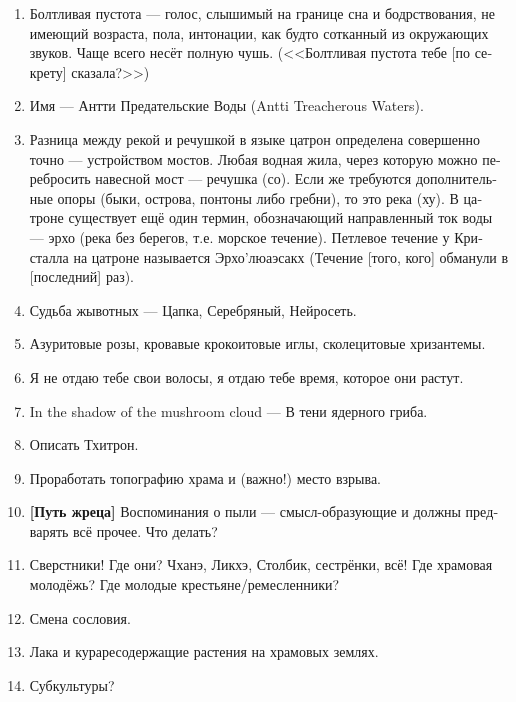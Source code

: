 \documentclass[a4paper,12pt,fleqn]{book}\usepackage{cooltooltips}\usepackage{polyglossia}\setdefaultlanguage[babelshorthands=true]{russian}\setotherlanguage{english}\defaultfontfeatures{Ligatures=TeX,Mapping=tex-text} \usepackage{xcolor}\definecolor{lightgray}{HTML}{bbbbbb}\color{lightgray}\newcommand{\ml}[3]{\textenglish{\textcolor{black}{#3}}}
\begin{document}
{\begin{enumerate}
\item Болтливая пустота --- голос, слышимый на границе сна и бодрствования, не имеющий возраста, пола, интонации, как будто сотканный из окружающих звуков.
Чаще всего несёт полную чушь.
(<<Болтливая пустота тебе [по секрету] сказала?>>)

\item Имя --- Антти Предательские Воды (Antti Treacherous Waters).

\item Разница между рекой и речушкой в языке цатрон определена совершенно точно --- устройством мостов.
Любая водная жила, через которую можно перебросить навесной мост --- речушка (со).
Если же требуются дополнительные опоры (быки, острова, понтоны либо гребни), то это река (ху).
В цатроне существует ещё один термин, обозначающий направленный ток воды --- эрхо (река без берегов, т.е. морское течение).
Петлевое течение у Кристалла на цатроне называется Эрхо'люаэсакх (Течение [того, кого] обманули в [последний] раз).

\item Судьба жывотных --- Цапка, Серебряный, Нейросеть.

\item Азуритовые розы, кровавые крокоитовые иглы, сколецитовые хризантемы.

\item Я не отдаю тебе свои волосы, я отдаю тебе время, которое они растут.

\item In the shadow of the mushroom cloud --- В тени ядерного гриба.

\item Описать Тхитрон.

\item Проработать топографию храма и (важно!) место взрыва.

\item \textbf{[Путь жреца]} Воспоминания о пыли --- смысл-образующие и должны предварять всё прочее.
Что делать?

\item Сверстники!
Где они?
Чханэ, Ликхэ, Столбик, сестрёнки, всё!
Где храмовая молодёжь?
Где молодые крестьяне/ремесленники?

\item Смена сословия.

\item Лака и кураресодержащие растения на храмовых землях.

\item Субкультуры?


\end{enumerate}}
\end{document}
